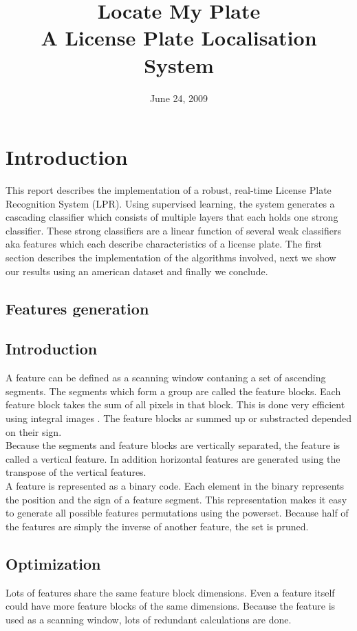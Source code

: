 \documentclass[a4paper,11pt]{article}
\title{Locate My Plate \\ A License Plate Localisation System}
\date{June 24, 2009}
\begin{document}
\maketitle
\section*{Introduction}
This report describes the implementation of a robust, real-time License Plate
Recognition System (LPR). Using supervised learning, the system generates a
cascading classifier which consists of multiple layers that each holds one
strong classifier. These strong classifiers are a linear function of several
weak classifiers aka features which each describe characteristics of a license
plate. The first section describes the implementation of the algorithms
involved, next we show our results using an american dataset and finally we
conclude.


\subsection{Features generation}
	\subsection{Introduction}
	A feature can be defined as a scanning window contaning a set of ascending
	segments. The segments which form a group are called the feature blocks. Each
	feature block takes the sum of all pixels in that block. This is done very
	efficient using integral images \cite{viola}. The feature blocks ar summed up
	or substracted depended on their sign.\\

	Because the segments and feature blocks are vertically separated, the
	feature is called a vertical feature.  In addition horizontal features are
	generated using the transpose of the vertical features.\\

	A feature is represented as a binary code. Each element in the binary
	represents the position and the sign of a feature segment.  This
	representation makes it easy to generate all possible features permutations
	using the powerset.  Because half of the features are simply the inverse of
	another feature, the set is pruned.

	\subsection{Optimization}
	Lots of features share the same feature block dimensions. Even a feature
	itself could have more feature blocks of the same dimensions. Because the
	feature is used as a scanning window, lots of redundant calculations are done.
\end{document}
